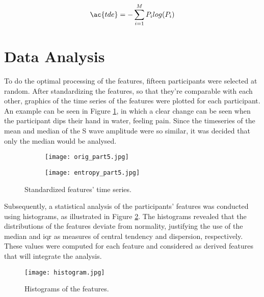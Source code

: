 \begin{equation} \label{eq:2}
\ac{tde}=-\sum_{i=1}^{M}P_ilog(P_i)
\end{equation}



\section{Data Analysis}
To do the optimal processing of the features, fifteen participants were selected at random. After standardizing the features, so that they're comparable with each other, graphics of the time series of the features were plotted for each participant. An example can be seen in Figure \ref{fig:featurestimeseries}, in which a clear change can be seen when the participant dips their hand in water, feeling pain. Since the timeseries of the mean and median of the S wave amplitude were so similar, it was decided that only the median would be analysed.


\begin{figure}[htbp]
    \centering
    \begin{subfigure}{\linewidth}
        \centering
        \texttt{[image: orig\_part5.jpg]}
    \end{subfigure}
    
    \vspace{0.3em} %
    
    \begin{subfigure}{\linewidth}
        \centering
        \texttt{[image: entropy\_part5.jpg]}
    \end{subfigure}
    
    \caption{Standardized features' time series.}
    \label{fig:featurestimeseries}
\end{figure}


Subsequently, a statistical analysis of the participants’ features was conducted using histograms, as illustrated in Figure \ref{fig:histogram}. The histograms revealed that the distributions of the features deviate from normality, justifying the use of the median and \ac{iqr} as measures of central tendency and dispersion, respectively.
These values were computed for each feature and considered as derived features that will integrate the analysis.

\begin{figure}[h!]
    \centering
    \texttt{[image: histogram.jpg]}
    \caption{Histograms of the features.}
    \label{fig:histogram}
\end{figure}

